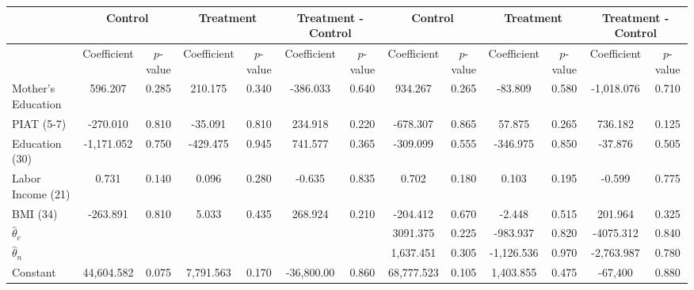 \begin{tabular}{lcccccccccccc} \toprule
&\multicolumn{2}{c}{Control} & \multicolumn{2}{c}{Treatment} & \multicolumn{2}{c}{Treatment - Control} & \multicolumn{2}{c}{Control} & \multicolumn{2}{c}{Treatment} & \multicolumn{2}{c}{Treatment - Control} \\ \midrule
 & Coefficient  & $p$-value  & Coefficient  & $p$-value & Coefficient  & $p$-value  & Coefficient  & $p$-value  & Coefficient  & $p$-value  & Coefficient  & $p$-value \\ \midrule
Mother's Education &   596.207 &     0.285 &   210.175 &     0.340 &  -386.033 &     0.640 &   934.267 &     0.265 &   -83.809 &     0.580 & -1,018.076 &     0.710 \\  
PIAT (5-7) &  -270.010 &     0.810 &   -35.091 &     0.810 &   234.918 &     0.220 &  -678.307 &     0.865 &    57.875 &     0.265 &   736.182 &     0.125 \\  
Education (30) & -1,171.052 &     0.750 &  -429.475 &     0.945 &   741.577 &     0.365 &  -309.099 &     0.555 &  -346.975 &     0.850 &   -37.876 &     0.505 \\  
Labor Income (21) &     0.731 &     0.140 &     0.096 &     0.280 &    -0.635 &     0.835 &     0.702 &     0.180 &     0.103 &     0.195 &    -0.599 &     0.775 \\  
BMI (34) &  -263.891 &     0.810 &     5.033 &     0.435 &   268.924 &     0.210 &  -204.412 &     0.670 &    -2.448 &     0.515 &   201.964 &     0.325 \\  
$\hat{\theta}_{c}$ &         &         &         &         &         &         &  3091.375 &     0.225 &  -983.937 &     0.820 & -4075.312 &     0.840 \\  
$\hat{\theta}_{n}$ &         &         &         &         &         &         &  1,637.451 &     0.305 & -1,126.536 &     0.970 & -2,763.987 &     0.780 \\  
Constant & 44,604.582 &     0.075 &  7,791.563 &     0.170 & -36,800.00 &     0.860 & 68,777.523 &     0.105 &  1,403.855 &     0.475 & -67,400 &     0.880 \\  
\bottomrule \end{tabular}
